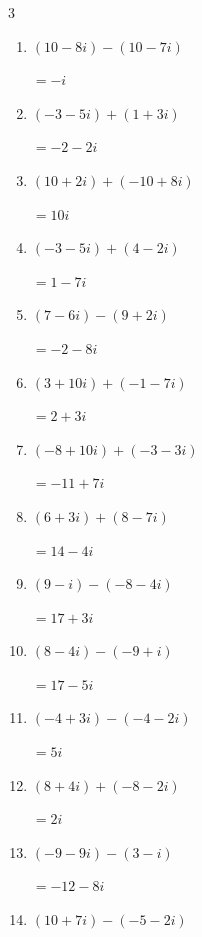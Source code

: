 \begin{multicols}{3}
\begin{enumerate}
  \item $\displaystyle (10-8i) - (10-7i)$

        $\displaystyle =-i$

  \item $\displaystyle (-3-5i) + (1+3i)$

        $\displaystyle =-2-2i$

  \item $\displaystyle (10+2i) + (-10+8i)$

        $\displaystyle =10i$

  \item $\displaystyle (-3-5i) + (4-2i)$

        $\displaystyle =1-7i$

  \item $\displaystyle (7-6i) - (9+2i)$

        $\displaystyle =-2-8i$

  \item $\displaystyle (3+10i) + (-1-7i)$

        $\displaystyle =2+3i$

\columnbreak %

  \item $\displaystyle (-8+10i) + (-3-3i)$

        $\displaystyle =-11+7i$

  \item $\displaystyle (6+3i) + (8-7i)$

        $\displaystyle =14-4i$

  \item $\displaystyle (9-i) - (-8-4i)$

        $\displaystyle =17+3i$

  \item $\displaystyle (8-4i) - (-9+i)$

        $\displaystyle =17-5i$

  \item $\displaystyle (-4+3i) - (-4-2i)$

        $\displaystyle =5i$

  \item $\displaystyle (8+4i) + (-8-2i)$

        $\displaystyle =2i$

  \item $\displaystyle (-9-9i) - (3-i)$

        $\displaystyle =-12-8i$

  \item $\displaystyle (10+7i) - (-5-2i)$


\end{enumerate}
\end{multicols}
